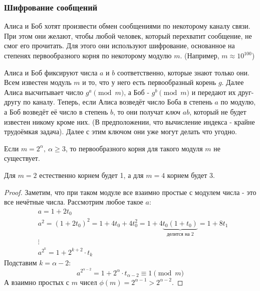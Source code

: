 \subsubsection*{Шифрование сообщений}

\begin{problem}
	Алиса и Боб хотят произвести обмен сообщениями по некоторому каналу связи. При этом они желают, чтобы любой человек, который перехватит сообщение, не смог его прочитать. Для этого они используют шифрование, основанное на степенях первообразного корня по некоторому модулю $m$. (Например, $m \approx 10^{100}$)
\end{problem}

\begin{solution}
	Алиса и Боб фиксируют числа $a$ и $b$ соответственно, которые знают только они. Всем известен модуль $m$ и то, что у него есть первообразный корень $g$. Далее Алиса высчитывает число $g^a \pmod m$, а Боб - $g^b \pmod m$ и передают их друг-другу по каналу. Теперь, если Алиса возведёт число Боба в степень $a$ по модулю, а Боб возведёт её число в степень $b$, то они получат \textit{ключ} $ab$, который не будет известен никому кроме них. (В предположении, что вычисление индекса - крайне трудоёмкая задача). Далее с этим ключом они уже могут делать что угодно.
\end{solution}

\begin{theorem}
	Если $m = 2^\alpha,\ \alpha \ge 3$, то первообразного корня для такого модуля $m$ не существует.
\end{theorem}

\begin{note}
	Для $m = 2$ естественно корнем будет 1, а для $m = 4$ корнем будет 3.
\end{note}

\begin{proof}
	Заметим, что при таком модуле все взаимно простые с модулем числа - это все нечётные числа. Рассмотрим любое такое $a$:
	\begin{align*}
		&{a = 1 + 2t_0}
		\\
		&{a^2 = (1 + 2t_0)^2 = 1 + 4t_0 + 4t_0^2 = 1 + 4\underbrace{t_0(1 + t_0)}_{\text{делится на } 2} = 1 + 8t_1}
		\\
		&{\vdots}
		\\
		&{a^{2^k} = 1 + 2^{k + 2} \cdot t_k}
	\end{align*}
	Подставим $k = \alpha - 2$:
	\[
		a^{2^{\alpha - 2}} = 1 + 2^{\alpha} \cdot t_{\alpha - 2} \equiv 1 \pmod m
	\]
	А взаимно простых с $m$ чисел $\phi(m) = 2^{\alpha - 1} > 2^{\alpha - 2}$.
\end{proof}

